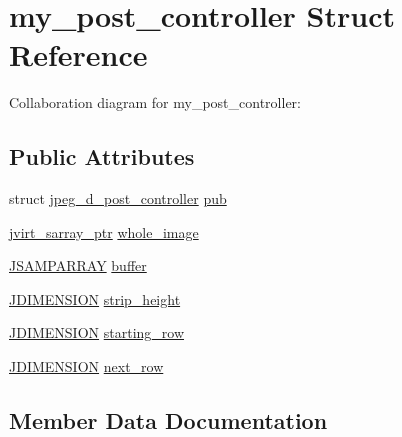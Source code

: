 \hypertarget{structmy__post__controller}{}\section{my\+\_\+post\+\_\+controller Struct Reference}
\label{structmy__post__controller}


Collaboration diagram for my\+\_\+post\+\_\+controller\+:
\subsection*{Public Attributes}
\begin{DoxyCompactItemize}
\item 
struct \hyperlink{structjpeg__d__post__controller}{jpeg\+\_\+d\+\_\+post\+\_\+controller} \hyperlink{structmy__post__controller_a4618ce845c38c4c563bdd28af061b727}{pub}
\item 
\hyperlink{jpeglib_8h_abc0b975077507c35b5a577e3ce9e4d91}{jvirt\+\_\+sarray\+\_\+ptr} \hyperlink{structmy__post__controller_ac2336623f2e802993b35b7db30053b68}{whole\+\_\+image}
\item 
\hyperlink{jpeglib_8h_ac9d5d1b829ed51769db69a37271a7e91}{J\+S\+A\+M\+P\+A\+R\+R\+A\+Y} \hyperlink{structmy__post__controller_aa571ce1fd2b5171a40d3b18d1496a2cf}{buffer}
\item 
\hyperlink{jmorecfg_8h_a04ed4674f6f1d0d50ec241531e38274f}{J\+D\+I\+M\+E\+N\+S\+I\+O\+N} \hyperlink{structmy__post__controller_a50ed0e70f9acab0995bbffb3aef6e9aa}{strip\+\_\+height}
\item 
\hyperlink{jmorecfg_8h_a04ed4674f6f1d0d50ec241531e38274f}{J\+D\+I\+M\+E\+N\+S\+I\+O\+N} \hyperlink{structmy__post__controller_a1e762395815d8f552d1a412cb5201575}{starting\+\_\+row}
\item 
\hyperlink{jmorecfg_8h_a04ed4674f6f1d0d50ec241531e38274f}{J\+D\+I\+M\+E\+N\+S\+I\+O\+N} \hyperlink{structmy__post__controller_a9aa9e3077c24ae10e47972c1955c6d38}{next\+\_\+row}
\end{DoxyCompactItemize}


\subsection{Member Data Documentation}
\hypertarget{structmy__post__controller_aa571ce1fd2b5171a40d3b18d1496a2cf}{}
